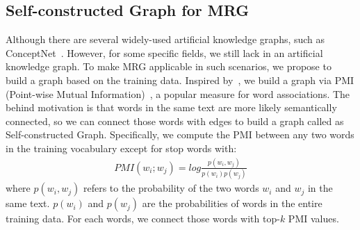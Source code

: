 \documentclass[letterpaper]{article} %
\begin{document}
\subsection{Self-constructed Graph for MRG}
Although there are several widely-used artificial knowledge graphs, such as ConceptNet~\cite{liu-singh:concept_net}. However, for some specific fields, 
we still lack in an artificial knowledge graph. 
To make MRG applicable in such scenarios,  we propose to build a graph based on the training data. Inspired by~\citet{textgcnPMI,pmigraph}, we build a graph via PMI (Point-wise Mutual Information)~\cite{andrew-et-al:pmi3}, a popular measure for word associations. The behind motivation is that words in the same text are more likely semantically connected, so we can connect those words with edges to build a graph called as Self-constructed Graph. Specifically, we compute the PMI between any two words in the training vocabulary except for stop words with:
\begin{equation}
\begin{split}
PMI(w_i;w_j) = log\frac{p(w_i,w_j)}{p(w_i)p(w_j)} 
\end{split}
\end{equation}
where $p(w_i, w_j)$ refers to the probability of the two words $w_i$ and $w_j$ in the same text. $p(w_i)$ and $p(w_j)$ are the probabilities of words in the entire training data. For each words, we connect those words with top-$k$ PMI values.



\end{document}
